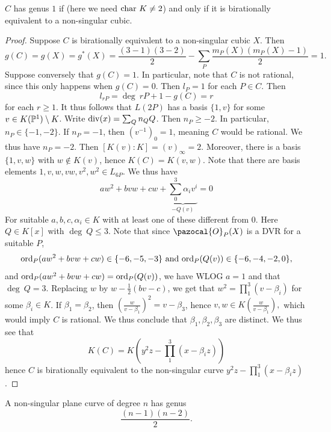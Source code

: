     \begin{proposition}
        $C$ has genus $1$ if (here we need $\mathrm{char} \ K \neq 2$) and only if it is birationally equivalent to a non-singular cubic. 
    \end{proposition}
    \begin{proof}
        Suppose $C$ is birationally equivalent to a non-singular cubic $X$. Then 
        $$
            g(C) = g(X)=g^\ast(X) = \frac{(3-1)(3-2)}{2}-\sum_{P}\frac{m_P(X)(m_P(X)-1)}{2} = 1. 
        $$
        Suppose conversely that $g(C) = 1$. In particular, note that $C$ is not rational, since this only happens when $g(C)=0$. Then $l_P= 1$ for each $P\in C$. Then 
        $$
            l_{rP} = \deg \ rP + 1-g(C) = r
        $$
        for each $r\geq 1$. It thus follows that $L(2P)$ has a basis $\{1,v\}$ for some $v\in K(\mathbb{P}^1)\setminus K$. Write $\mathrm{div}(x) = \sum_Q n_Q Q$. Then $n_P\geq -2$. In particular, $n_P\in \{-1,-2\}$. If $n_P = -1$, then $(v^{-1})_0 = 1$, meaning $C$ would be rational. We thus have $n_P = -2$. Then $[K(v) : K] = (v)_\infty =2$. Moreover, there is a basis $\{1,v,w\}$ with $w\notin K(v)$, hence $K(C) = K(v,w)$. Note that there are basis elements $1,v,w,vw,v^2,w^2\in L_{6P}$. We thus have 
        \begin{equation}\label{PolynomialEquation}
            aw^2 + bvw + cw + \underbrace{\sum_0^3 \alpha_iv^i}_{-Q(v)} = 0
        \end{equation}
        For suitable $a,b,c,\alpha_i\in K$ with at least one of these different from $0$. Here $Q\in K[x]$ with $\deg \ Q \leq 3$. Note that since $\pazocal{O}_P(X)$ is a DVR for a suitable $P$,
        $$
            \mathrm{ord}_P(aw^2+bvw + cw)\in \{-6,-5,-3\} \text{ and } \mathrm{ord}_P(Q(v)) \in \{-6,-4,-2,0\},
        $$
        and $\mathrm{ord}_P(aw^2+bvw + cw)= \mathrm{ord}_P(Q(v))$, we have WLOG $a=1$ and that $\deg \ Q = 3$. Replacing $w$ by $w-\frac{1}{2}(bv-c)$, we get that $w^2 = \prod_1^3 (v-\beta_i)$ for some $\beta_i\in K$. If $\beta_1=\beta_2$, then $\left(\frac{w}{v-\beta_1}\right)^2 = v-\beta_3$, hence $v,w\in K\left(\frac{w}{v-\beta_1}\right),$ which would imply $C$ is rational. We thus conclude that $\beta_1,\beta_2,\beta_3$ are distinct. We thus see that 
        $$
            K(C) = K(y^2z-\prod_1^3 (x-\beta_iz))
        $$
        hence $C$ is birationally equivalent to the non-singular curve $y^2z-\prod_1^3 (x-\beta_iz)$.
    \end{proof}
    \begin{corollary}
        A non-singular plane curve of degree $n$ has genus 
        $$
            \frac{(n-1)(n-2)}{2}.
        $$
    \end{corollary}
